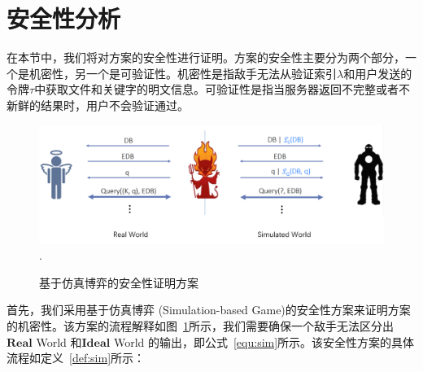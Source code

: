 \section{安全性分析}
\label{sec:single-security}
在本节中，我们将对方案的安全性进行证明。方案的安全性主要分为两个部分，一个是机密性，另一个是可验证性。机密性是指敌手无法从验证索引$\lambda$和用户发送的令牌$\tau$中获取文件和关键字的明文信息。可验证性是指当服务器返回不完整或者不新鲜的结果时，用户不会验证通过。
\begin{figure}[t]
\centering
\includegraphics[width=6 in]{fig/security}
\DeclareGraphicsExtensions.
\caption{基于仿真博弈的安全性证明方案}
\label{fig:security}
\end{figure}

首先，我们采用基于仿真博弈 (Simulation-based Game)的安全性方案来证明方案的机密性。该方案的流程解释如图~\ref{fig:security}所示，我们需要确保一个敌手无法区分出$\mathbf{Real}$ World 和$\mathbf{Ideal}$ World 的输出，即公式~\ref{equ:sim}所示。该安全性方案的具体流程如定义~\ref{def:sim}所示：

